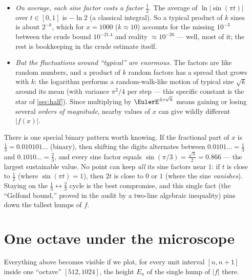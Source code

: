 \documentclass[11pt,oneside]{article}
\theoremstyle{remark}
\begin{document}
\begin{itemize}
\item \emph{On average, each sine factor costs a factor
$\tfrac12$.}  The average of $\ln|\sin(\pi t)|$ over $t\in[0,1]$ is
$-\ln2$ (a classical integral).  So a typical product of $k$ sines is
about $2^{-k}$, which for $x=1000$ ($k\approx10$) accounts for
the missing $10^{-3}$ between the crude bound $10^{-21.4}$ and reality
$\approx10^{-26}$ --- well, most of it; the rest is bookkeeping in the
crude estimate itself.
\item \emph{But the fluctuations around ``typical'' are enormous.}
The factors are like random numbers, and a product of $k$ random
factors has a spread that grows with $k$: the logarithm performs a
random-walk-like motion of typical size $\sqrt{k}$ around its mean
(with variance $\pi^2/4$ per step --- this specific constant is the
star of \cref{sec:half}).  Since multiplying by $\EulerE^{\pm c\sqrt{k}}$
means gaining or losing several \emph{orders of magnitude}, nearby
values of $x$ can give wildly different $|f(x)|$.
\end{itemize}

There is one special binary pattern worth knowing.  If the fractional
part of $x$ is $\tfrac13=0.010101\ldots$ (binary), then shifting the
digits alternates between $0.0101\ldots=\tfrac13$ and
$0.1010\ldots=\tfrac23$, and every sine factor equals
$\sin(\pi/3)=\tfrac{\sqrt3}{2}=0.866$ --- the largest sustainable
value.  No point can keep \emph{all} its sine factors near $1$:
if $t$ is close to $\tfrac12$ (where $\sin(\pi t)=1$), then $2t$ is
close to $0$ or $1$ (where the sine \emph{vanishes}).  Staying on the
$\tfrac13\leftrightarrow\tfrac23$ cycle is the best compromise, and
this single fact (the ``Gelfond bound,'' proved in the audit by a
two-line algebraic inequality) pins down the tallest humps of $f$.

\section{One octave under the microscope}

Everything above becomes visible if we plot, for every unit interval
$[n,n+1]$ inside one ``octave'' $[512,1024]$, the height $E_n$ of the
single hump of $|f|$ there.
\end{document}
